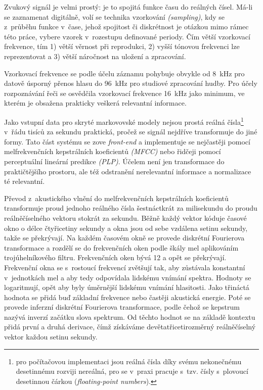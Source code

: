 Zvukový signál je velmi prostý: je to spojitá funkce času do reálných čísel.
Má-li se zaznamenat digitálně, volí se technika vzorkování \textit{(sampling)},
kdy se z~průběhu funkce v~čase, jehož spojitost či diskrétnost je otázkou mimo
rámec této práce, vybere vzorek v~rozestupu definované periody. Čím větší
vzorkovací frekvence, tím 1) větší věrnost při reprodukci, 2) vyšší tónovou
frekvenci lze reprezentovat a 3) větší náročnost na uložení a zpracování.

Vzorkovací frekvence se podle účelu záznamu pohybuje obvykle od 8~kHz pro
datově úsporný přenos hlasu do 96~kHz pro studiové zpracování hudby. Pro účely
rozpoznávání řeči se osvědčila vzorkovací frekvence 16~kHz jako minimum, ve
kterém je obsažena prakticky veškerá relevantní informace.

Jako vstupní data pro skryté markovovské modely nejsou prostá reálná
čísla\footnote{pro počítačovou implementaci jsou reálná čísla díky svému
nekonečnému desetinnému rozviji nereálná, pro se v~praxi pracuje s~tzv. čísly
s~plovoucí desetinnou čárkou (\textit{floating-point numbers}).} v~řádu tisíců
za sekundu praktická, pročež se signál nejdříve transformuje do jiné formy. Tato
část systému se zove \textit{front-end} a implementuje se nejčastěji pomocí
melfrekvenčních kepstrálních koeficientů \textit{(MFCC)} nebo řidčeji pomocí
perceptuální lineární predikce \textit{(PLP)}. Účelem není jen transformace do
praktičtějšího prostoru, ale též odstranění nerelevantní informace a normalizace
té relevantní.

Převod z~akustického vlnění do melfrekvenčních kepstrálních koeficientů
transformuje proud jednoho reálného čísla šestnáctkrát za milisekundu do proudu
reálněčíselného vektoru stokrát za sekundu. Běžně každý vektor kóduje časové
okno o délce čtyřicetiny sekundy a okna jsou od sebe vzdálena setinu sekundy,
takže se překrývají. Na každém časovém okně se provede diskrétní Fourierova
transformace a rozdělí se do frekvenčních oken podle škály
mel\cite{stevens1937scale} aplikováním trojúhelníkového filtru. Frekvenčních
oken bývá 12 a opět se překrývají. Frekvenční okna se s~rostoucí frekvencí
zvětšují tak, aby zůstávala konstantní v~jednotkách mel a aby tedy odpovídala
lidskému vnímání spektra. Hodnoty se logaritmují, opět aby byly
úměrnější lidskému vnímání hlasitosti. Jako třináctá hodnota se přidá buď
základní frekvence nebo častěji akustická energie. Poté se provede inferzní
diskrétní Fourierova transformace, podle čehož se kepstrum nazývá inverzí
začátku slova spektrum. Od těchto hodnot se na základě kontextu přidá první a
druhá derivace, čímž získáváme devětatřicetirozměrný reálněčíselný vektor každou
setinu sekundy.

